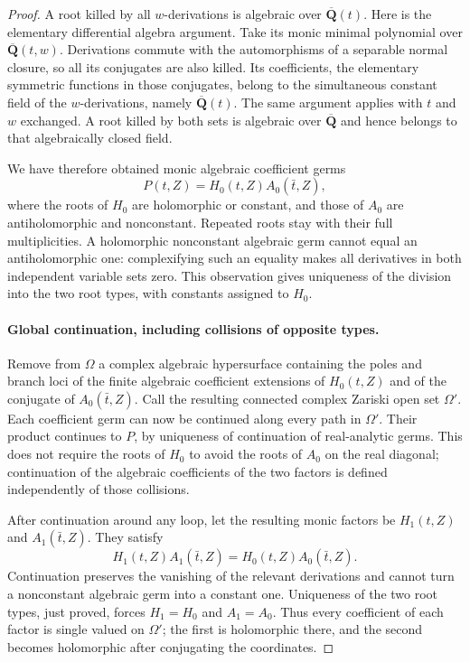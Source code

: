 \begin{proof}
A root killed by all $w$-derivations is algebraic over
$\overline{\mathbf Q}(t)$. Here is the elementary differential
algebra argument. Take its monic minimal polynomial over
$\overline{\mathbf Q}(t,w)$. Derivations commute with the
automorphisms of a separable normal closure, so all its conjugates
are also killed. Its coefficients, the elementary symmetric
functions in those conjugates, belong to the simultaneous constant
field of the $w$-derivations, namely $\overline{\mathbf Q}(t)$.
The same argument applies with $t$ and $w$ exchanged. A root killed
by both sets is algebraic over $\overline{\mathbf Q}$ and hence
belongs to that algebraically closed field.

We have therefore obtained monic algebraic coefficient germs
\[
 P(t,Z)=H_0(t,Z)A_0(\bar t,Z),
\]
where the roots of $H_0$ are holomorphic or constant, and those of
$A_0$ are antiholomorphic and nonconstant. Repeated roots stay with
their full multiplicities. A holomorphic nonconstant algebraic
germ cannot equal an antiholomorphic one: complexifying such an
equality makes all derivatives in both independent variable sets
zero. This observation gives uniqueness of the division into the
two root types, with constants assigned to $H_0$.

\paragraph{Global continuation, including collisions of opposite types.}
Remove from $\Omega$ a complex algebraic hypersurface containing
the poles and branch loci of the finite algebraic coefficient
extensions of $H_0(t,Z)$ and of the conjugate of
$A_0(\bar t,Z)$. Call the resulting connected complex Zariski
open set $\Omega'$. Each coefficient germ can now be continued
along every path in $\Omega'$. Their product continues to $P$,
by uniqueness of continuation of real-analytic germs. This does
not require the roots of $H_0$ to avoid the roots of $A_0$ on the
real diagonal; continuation of the algebraic coefficients of
the two factors is defined independently of those collisions.

After continuation around any loop, let the resulting monic
factors be $H_1(t,Z)$ and $A_1(\bar t,Z)$. They satisfy
\[
 H_1(t,Z)A_1(\bar t,Z)=H_0(t,Z)A_0(\bar t,Z).
\]
Continuation preserves the vanishing of the relevant derivations
and cannot turn a nonconstant algebraic germ into a constant one.
Uniqueness of the two root types, just proved, forces $H_1=H_0$
and $A_1=A_0$. Thus every coefficient of each factor is single
valued on $\Omega'$; the first is holomorphic there, and the
second becomes holomorphic after conjugating the coordinates.


\end{proof}
